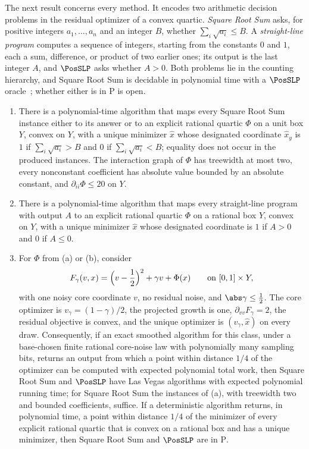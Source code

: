 The next result concerns every method. It encodes two arithmetic decision
problems in the residual optimizer of a convex quartic. \emph{Square Root
Sum} asks, for positive integers $a_1,\ldots,a_n$ and an integer $B$, whether
$\sum_i\sqrt{a_i}\le B$. A \emph{straight-line program} computes a sequence
of integers, starting from the constants $0$ and $1$, each a sum, difference,
or product of two earlier ones; its output is the last integer $A$, and
$\PosSLP$ asks whether $A>0$. Both problems lie in the counting hierarchy,
and Square Root Sum is decidable in polynomial time with a $\PosSLP$
oracle~\citep{allender2009-on-the-complexity-of-numerical}; whether either
is in $\mathrm P$ is open.

\begin{theorem}\label{thm:lim:posslp}
\leavevmode
\begin{enumerate}[label=(\alph*)]
\item\label{it:lim:pt-srs} There is a polynomial-time algorithm that maps
every Square Root Sum instance either to its answer or to an explicit
rational quartic $\Phi$ on a unit box $Y$, convex on $Y$, with a unique
minimizer $\hat x$ whose designated coordinate $\hat x_y$ is $1$ if
$\sum_i\sqrt{a_i}>B$ and $0$ if $\sum_i\sqrt{a_i}<B$; equality does not
occur in the produced instances. The interaction graph of $\Phi$ has
treewidth at most two, every nonconstant coefficient has absolute value
bounded by an absolute constant, and $\partial_{ii}\Phi\le20$ on $Y$.
\item\label{it:lim:pt-posslp} There is a polynomial-time algorithm that maps
every straight-line program with output $A$ to an explicit rational quartic
$\Phi$ on a rational box $Y$, convex on $Y$, with a unique minimizer $\hat x$
whose designated coordinate is $1$ if $A>0$ and $0$ if $A\le0$.
\item\label{it:lim:pt-core} For $\Phi$ from (a) or (b), consider
\[
 F_\gamma(v,x)=\Bigl(v-\frac12\Bigr)^2+\gamma v+\Phi(x)\qquad\text{on }[0,1]\times Y,
\]
with one noisy core coordinate $v$, no residual noise, and
$\abs\gamma\le\frac12$. The core optimizer is $v_\gamma=(1-\gamma)/2$, the
projected growth is one, $\partial_{vv}F_\gamma=2$, the residual objective
is convex, and the unique optimizer is $(v_\gamma,\hat x)$ on every draw.
Consequently, if an exact smoothed algorithm for this class, under a
base-chosen finite rational core-noise law with polynomially many sampling
bits, returns an output from which a point within distance $1/4$ of the
optimizer can be computed with expected polynomial total work, then Square
Root Sum and $\PosSLP$ have Las Vegas algorithms with expected polynomial
running time; for Square Root Sum the instances of (a), with treewidth two
and bounded coefficients, suffice. If a deterministic algorithm returns, in
polynomial time, a point within distance $1/4$ of the minimizer of every
explicit rational quartic that is convex on a rational box and has a unique
minimizer, then Square Root Sum and $\PosSLP$ are in $\mathrm P$.
\end{enumerate}
\end{theorem}

